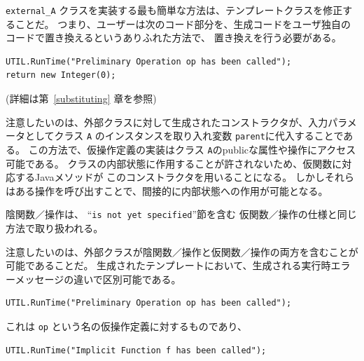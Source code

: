 \documentclass[\pformat,11pt]{jarticle}
\begin{document}
{\tt external\_A} クラスを実装する最も簡単な方法は、テンプレートクラスを修正することだ。
つまり、ユーザーは次のコード部分を、生成コードをユーザ独自のコードで置き換えるというありふれた方法で、
置き換えを行う必要がある。

\begin{screen}
\begin{verbatim}
UTIL.RunTime("Preliminary Operation op has been called");
return new Integer(0);
\end{verbatim}
\end{screen}

(詳細は第~\ref{substituting} 章を参照)



注意したいのは、外部クラスに対して生成されたコンストラクタが、入力パラメータとしてクラス
{\tt A} のインスタンスを取り入れ変数 {\tt parent}に代入することである。
この方法で、仮操作定義の実装はクラス {\tt A}のpublicな属性や操作にアクセス可能である。
クラスの内部状態に作用することが許されないため、仮関数に対応するJavaメソッドが
このコンストラクタを用いることになる。
しかしそれらはある操作を呼び出すことで、間接的に内部状態への作用が可能となる。

陰関数／操作は、 ``{\tt is not yet specified}''節を含む
仮関数／操作の仕様と同じ方法で取り扱われる。

注意したいのは、外部クラスが陰関数／操作と仮関数／操作の両方を含むことが可能であることだ。
生成されたテンプレートにおいて、生成される実行時エラーメッセージの違いで区別可能である。

\begin{screen}
\begin{verbatim}
UTIL.RunTime("Preliminary Operation op has been called");
\end{verbatim}
\end{screen}

これは {\tt op} という名の仮操作定義に対するものであり、

\begin{screen}
\begin{verbatim}
UTIL.RunTime("Implicit Function f has been called");
\end{verbatim}
\end{screen}
\end{document}
